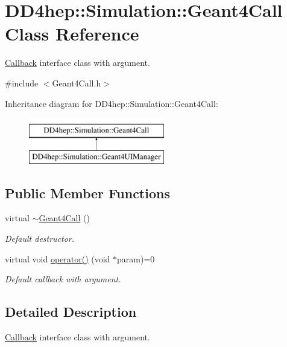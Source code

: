 \hypertarget{class_d_d4hep_1_1_simulation_1_1_geant4_call}{}\section{D\+D4hep\+:\+:Simulation\+:\+:Geant4\+Call Class Reference}
\label{class_d_d4hep_1_1_simulation_1_1_geant4_call}


\hyperlink{class_d_d4hep_1_1_callback}{Callback} interface class with argument.  




{\ttfamily \#include $<$Geant4\+Call.\+h$>$}

Inheritance diagram for D\+D4hep\+:\+:Simulation\+:\+:Geant4\+Call\+:\begin{figure}[H]
\begin{center}
\leavevmode
\includegraphics[height=2.000000cm]{class_d_d4hep_1_1_simulation_1_1_geant4_call}
\end{center}
\end{figure}
\subsection*{Public Member Functions}
\begin{DoxyCompactItemize}
\item 
virtual \hyperlink{class_d_d4hep_1_1_simulation_1_1_geant4_call_ae26b15b06c969e57c214235d31fa754f}{$\sim$\+Geant4\+Call} ()
\begin{DoxyCompactList}\small\item\em Default destructor. \end{DoxyCompactList}\item 
virtual void \hyperlink{class_d_d4hep_1_1_simulation_1_1_geant4_call_ab55505a1c9fb5e928c995d1312d4158e}{operator()} (void $\ast$param)=0
\begin{DoxyCompactList}\small\item\em Default callback with argument. \end{DoxyCompactList}\end{DoxyCompactItemize}


\subsection{Detailed Description}
\hyperlink{class_d_d4hep_1_1_callback}{Callback} interface class with argument. 

